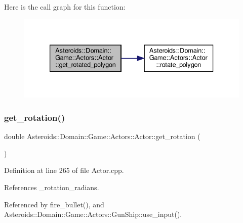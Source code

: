 Here is the call graph for this function\+:\nopagebreak
\begin{figure}[H]
\begin{center}
\leavevmode
\includegraphics[width=333pt]{classAsteroids_1_1Domain_1_1Game_1_1Actors_1_1Actor_a8518140e16304bd6cf7a8bc6a99c9509_cgraph}
\end{center}
\end{figure}
\mbox{\label{classAsteroids_1_1Domain_1_1Game_1_1Actors_1_1Actor_afa2ca9372ddf8f08de11682dae43840f}} 
\subsubsection{\texorpdfstring{get\+\_\+rotation()}{get\_rotation()}}
{\footnotesize\ttfamily double Asteroids\+::\+Domain\+::\+Game\+::\+Actors\+::\+Actor\+::get\+\_\+rotation (\begin{DoxyParamCaption}{ }\end{DoxyParamCaption})}



Definition at line 265 of file Actor.\+cpp.



References \+\_\+rotation\+\_\+radians.



Referenced by fire\+\_\+bullet(), and Asteroids\+::\+Domain\+::\+Game\+::\+Actors\+::\+Gun\+Ship\+::use\+\_\+input().

